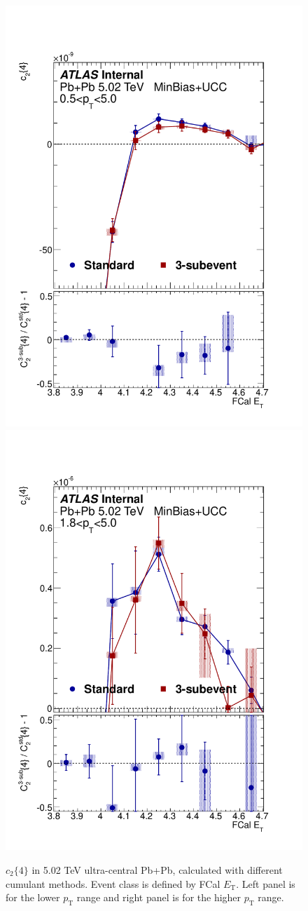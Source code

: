 \begin{figure}[H]
\centering
\includegraphics[width=.45\linewidth]{figs/sec_result/PbPb502_UCC/PbPb502_mtd_Har2_pt0.pdf}
\includegraphics[width=.45\linewidth]{figs/sec_result/PbPb502_UCC/PbPb502_mtd_Har2_pt5.pdf}
\caption{$c_2\{4\}$ in 5.02 TeV ultra-central Pb+Pb, calculated with different cumulant methods. Event class is defined by FCal $E_\text{T}$. Left panel is for the lower $p_\text{T}$ range and right panel is for the higher $p_\text{T}$ range.}
\label{fig:PbPb502_UCC_FCal_v2_mtd}
\end{figure}

